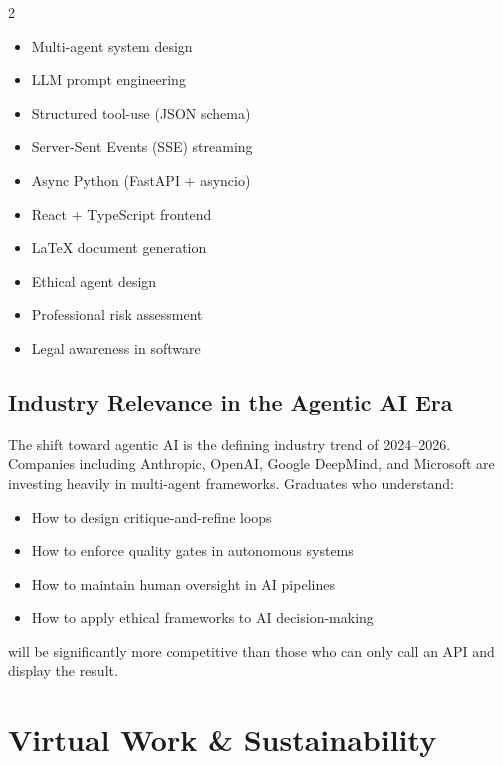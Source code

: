 \documentclass[12pt,a4paper]{article}
\begin{document}
\begin{multicols}{2}
\begin{itemize}[noitemsep]
  \item Multi-agent system design
  \item LLM prompt engineering
  \item Structured tool-use (JSON schema)
  \item Server-Sent Events (SSE) streaming
  \item Async Python (FastAPI + asyncio)
  \item React + TypeScript frontend
  \item LaTeX document generation
  \item Ethical agent design
  \item Professional risk assessment
  \item Legal awareness in software
\end{itemize}
\end{multicols}

\subsection{Industry Relevance in the Agentic AI Era}

The shift toward agentic AI is the defining industry trend of 2024--2026. Companies including
Anthropic, OpenAI, Google DeepMind, and Microsoft are investing heavily in multi-agent
frameworks. Graduates who understand:
\begin{itemize}[noitemsep]
  \item How to design critique-and-refine loops
  \item How to enforce quality gates in autonomous systems
  \item How to maintain human oversight in AI pipelines
  \item How to apply ethical frameworks to AI decision-making
\end{itemize}
will be significantly more competitive than those who can only call an API and display the
result.


\section{Virtual Work \& Sustainability}
\end{document}
